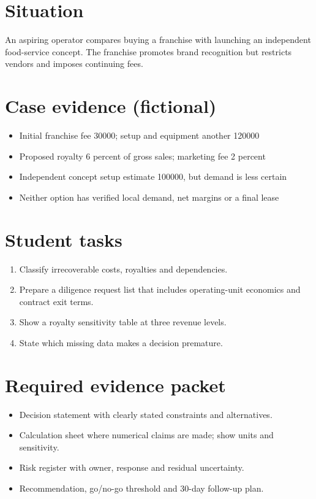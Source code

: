 \documentclass[11pt]{article}
\begin{document}
\SuiteOpen
\section{Situation}
An aspiring operator compares buying a franchise with launching an independent food-service concept. The franchise promotes brand recognition but restricts vendors and imposes continuing fees.
\section{Case evidence (fictional)}
\begin{itemize}[leftmargin=*,itemsep=3pt]
\item Initial franchise fee 30000; setup and equipment another 120000
\item Proposed royalty 6 percent of gross sales; marketing fee 2 percent
\item Independent concept setup estimate 100000, but demand is less certain
\item Neither option has verified local demand, net margins or a final lease
\end{itemize}

\section{Student tasks}
\begin{enumerate}[leftmargin=*,itemsep=5pt]
\item Classify irrecoverable costs, royalties and dependencies.
\item Prepare a diligence request list that includes operating-unit economics and contract exit terms.
\item Show a royalty sensitivity table at three revenue levels.
\item State which missing data makes a decision premature.
\end{enumerate}

\section{Required evidence packet}
\begin{itemize}[leftmargin=*,itemsep=3pt]
\item Decision statement with clearly stated constraints and alternatives.
\item Calculation sheet where numerical claims are made; show units and sensitivity.
\item Risk register with owner, response and residual uncertainty.
\item Recommendation, go/no-go threshold and 30-day follow-up plan.
\end{itemize}
\end{document}
